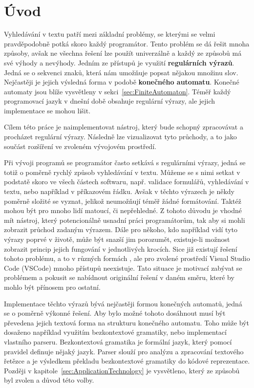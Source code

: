 \chapter{Úvod}\label{sec:Introduction}

Vyhledávání v textu patří mezi základní problémy, se kterými se velmi pravděpodobně potká skoro každý programátor. 
Tento problém se dá řešit mnoha způsoby, avšak ne všechna řešení lze použít univerzálně a každý ze způsobů má své výhody a nevýhody.
Jedním ze přístupů je využití \textbf{regulárních výrazů}. 
Jedná se o sekvenci znaků, která nám umožňuje popsat nějakou množinu slov.
Nejčastěji je jejich výsledná forma v podobě \textbf{konečného automatu}. 
Konečné automaty jsou blíže vysvětleny v sekci~\ref{sec:FiniteAutomaton}.
Téměř každý programovací jazyk v dnešní době obsahuje regulární výrazy, ale jejich implementace se mohou lišit.

Cílem této práce je naimplementovat nástroj, který bude schopný zpracovávat a procházet regulární výrazy. 
Následně lze vizualizovat tyto průchody, a to jako součást rozšíření ve zvoleném vývojovém prostředí.

Při vývoji programů se programátor často setkává s regulárními výrazy, jedná se totiž o poměrně rychlý způsob vyhledávání v textu. 
Můžeme se s nimi setkat v podstatě skoro ve všech částech softwaru, např. validace formulářů, vyhledávání v textu, nebo například v příkazovém řádku.
Avšak v těchto výrazech je někdy poměrně složité se vyznat, jelikož neumožňují téměř žádné formátování. 
Taktéž mohou být pro mnoho lidí matoucí, či nepřehledné.
Z tohoto důvodu je vhodné mít nástroj, který potencionálně usnadní práci programátorům, tak aby si mohli zobrazit průchod zadaným výrazem.
Dále pro někoho, kdo například vidí tyto výrazy poprvé v životě, může být snazší jim porozumět, existuje-li možnost zobrazit princip jejich fungování v jednotlivých krocích.
Sice již existují řešení tohoto problému, a to v různých formách \cite{Dib, Regexper, RegExr}, ale pro zvolené prostředí Visual Studio Code (VSCode) mnoho přístupů neexistuje.
Tato situace je motivací zabývat se problémem a pokusit se nabídnout originální řešení v daném směru, které by mohlo být přínosem pro ostatní.

Implementace těchto výrazů bývá nejčastěji formou konečných automatů, jedná se o poměrně výkonné řešení. 
Aby bylo možné tohoto dosáhnout musí být převedena jejich textová forma na strukturu konečného automatu.
Toho může být dosaženo například využitím bezkontextové gramatiky, nebo implementací vlastního parseru.
Bezkontextová gramatika je formální jazyk, který pomocí pravidel definuje nějaký jazyk.
Parser slouží pro analýzu a zpracování textového řetězce a je výsledkem překladu bezkontextové gramatiky do kódové reprezentace.
Později v kapitole~\ref{sec:ApplicationTechnology} je vysvětleno, který ze způsobů byl zvolen a důvod této volby.

